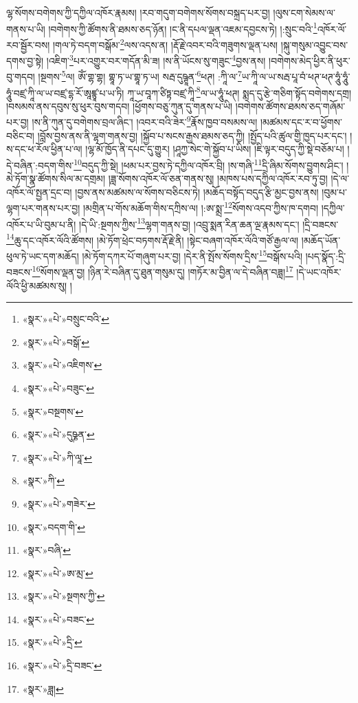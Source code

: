 ལྷ་སོགས་བགེགས་ཀྱི་དཀྱིལ་འཁོར་རྣམས། །རབ་གདུག་བགེགས་སོགས་བསྐྲད་པར་བྱ། །ལུས་ངག་སེམས་ལ་གནས་པ་ཡི། །བགེགས་ཀྱི་ཚོགས་ནི་ཐམས་ཅད་ཉོན། །ང་ནི་དཔལ་ལྡན་འཇམ་དབྱངས་ཏེ། །:སྲུང་བའི་\footnote{«སྣར་»«པེ་»བསྲུང་བའི་}འཁོར་ལོ་རབ་སྦྱོར་བས། །གལ་ཏེ་བདག་བསྒོམ་\footnote{«སྣར་»«པེ་»བསྒོ་}ལས་འདས་ན། །རྡོ་རྗེ་འབར་བའི་གཟུགས་ལྡན་པས། །སྐུ་གསུམ་འབྱུང་བས་དགས་བྱ་སྟེ། །འཇིག་\footnote{«སྣར་»«པེ་»འཇིགས་}པར་འགྱུར་བར་གདོན་མི་ཟ། །ས་ནི་ཡོངས་སུ་གཟུང་\footnote{«སྣར་»«པེ་»བཟུང་}བྱས་ནས། །བགེགས་མེད་ཕྱིར་ནི་ཕུར་བུ་གདབ། །སྔགས་\footnote{«སྣར་»བསྔགས་}ལ། ཨོཾ་གྷ་གྷ། གྷཱ་ཏ་ཡ་གྷཱ་ཏ་ཡ། སརྦ་དུཥྚཱན་\footnote{«སྣར་»«པེ་»དུཥྞན་}ཕཊ། :ཀཱི་ལ་\footnote{«སྣར་»«པེ་»ཀི་ལཱ་}ཡ་ཀཱི་ལ་ཡ་སརྦ་པཱ་བཾ་ཕཊ་ཕཊ་ཧཱུཾ་ཧཱུཾ་ཧཱུཾ་བཛྲ་ཀཱི་ལ་ཡ་བཛྲ་དྷ་རོ་ཨཱཛྙཱ་པ་ཡ་ཏི། ཀཱ་ཡ་བཱཀ་ཙིཏྟ་བཛྲ་ཀཱི་\footnote{«སྣར་»ཀི་}ལ་ཡ་ཧཱུཾ་ཕཊ། སྨད་དུ་རྩེ་གཅིག་སྟོད་བགེགས་དགྲ། །བསམས་ནས་དབུས་སུ་ཕུར་བུས་གདབ། །ཕྱོགས་བཅུ་ཀུན་དུ་གནས་པ་ཡི། །བགེགས་ཚོགས་ཐམས་ཅད་གཞོམ་པར་བྱ། །ས་ནི་ཀུན་དུ་བགེགས་བྲལ་ཞིང་། །འབར་བའི་ཟེར་\footnote{«སྣར་»«པེ་»གཟེར་}རྣོས་ཁྱབ་བསམས་ལ། །མཚམས་དང་ར་བ་ཕྱོགས་བཅིང་བ། །བློས་བྱས་ནས་ནི་ལྷག་གནས་བྱ། །སྐྱོབ་པ་སངས་རྒྱས་ཐམས་ཅད་ཀྱི། །སྤྱོད་པའི་ཚུལ་གྱི་ཁྱད་པར་དང་། །ས་དང་ཕ་རོལ་ཕྱིན་པ་ལ། །ལྷ་མོ་ཁྱོད་ནི་དཔང་དུ་གྱུར། །ཤཱཀྱ་སེང་གེ་སྐྱོབ་པ་ཡིས། །ཇི་ལྟར་བདུད་ཀྱི་སྡེ་བཅོམ་པ། །དེ་བཞིན་:བདག་གིས་\footnote{«སྣར་»བདག་གི་}བདུད་ཀྱི་སྡེ། །ཕམ་པར་བྱས་ཏེ་དཀྱིལ་འཁོར་བྲི། །ས་གཞི་\footnote{«སྣར་»བཞི་}དྲི་ཞིམ་སོགས་བྱུགས་ཤིང་། །མེ་ཏོག་སྣ་ཚོགས་སིལ་མ་དགྲམ། །ཟླ་སོགས་འཁོར་ལོ་ཅན་གནས་སུ། །མཁས་པས་དཀྱིལ་འཁོར་རབ་ཏུ་བྱ། །དེ་ལ་འཁོར་ལོ་སྤྱན་དྲང་བ། །བྱས་ནས་མཚམས་ལ་སོགས་བཅིངས་ཏེ། །མཆོད་བསྟོད་བདུད་རྩི་མྱང་བྱས་ནས། །བུམ་པ་ལྷག་པར་གནས་པར་བྱ། །མགྲིན་པ་གོས་མཆོག་གིས་དཀྲིས་ལ། །:ཨ་སྨྲ་\footnote{«སྣར་»«པེ་»ཨ་མྲ་}སོགས་འདབ་ཀྱིས་ཁ་དགབ། །དཀྱིལ་འཁོར་པ་ཡི་བུམ་པ་ནི། །དེ་ཡི་:སྔགས་ཀྱིས་\footnote{«སྣར་»«པེ་»སྔགས་ཀྱི་}ལྷག་གནས་བྱ། །འབྲུ་སྨན་རིན་ཆན་ལྔ་རྣམས་དང་། །དྲི་བཟངས་\footnote{«སྣར་»«པེ་»བཟང་}ཆུ་དང་འཁོར་ལོའི་ཚོགས། །མེ་ཏོག་ཕྲེང་བཏགས་རྡོ་རྗེ་ནི། །སྟེང་བཞག་འཁོར་ལོའི་གཙོ་རྒྱལ་ལ། །མཆོད་ཡོན་ཕུལ་ཏེ་ཡང་དག་མཆོད། །མེ་ཏོག་དཀར་པོ་གཞུག་པར་བྱ། །དེར་ནི་སྤོས་སོགས་དྲིས་\footnote{«སྣར་»«པེ་»དྲི་}བསྒོས་པའི། །པད་སྣོད་:དྲི་བཟངས་\footnote{«སྣར་»«པེ་»དྲི་བཟང་}སོགས་ལྡན་བྱ། །ཉིན་རེ་བཞིན་དུ་ཐུན་གསུམ་དུ། །གཏོར་མ་བྱིན་ལ་དེ་བཞིན་བཟླ།\footnote{«སྣར་»ཟླ།} །དེ་ཡང་འཁོར་ལོའི་ཕྱི་མཚམས་སུ། །
